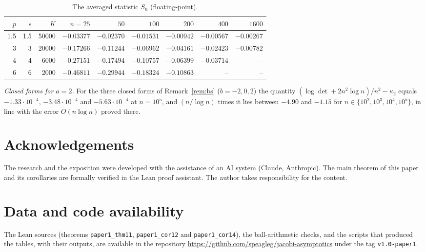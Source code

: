 \documentclass{amsart}
\theoremstyle{definition}
\theoremstyle{remark}
\numberwithin{equation}{section}
\begin{document}
\begin{table}[ht]
\centering
\small
\setlength{\tabcolsep}{3pt}
\begin{tabular}{rrrrrrrrr}
\hline
$p$ & $s$ & $K$ & $n=25$ & $50$ & $100$ & $200$ & $400$ & $1600$\\
\hline
1.5 & 1.5 & 50000 & $-0.03377$ & $-0.02370$ & $-0.01531$ & $-0.00942$ & $-0.00567$ & $-0.00267$\\
3   & 3   & 20000 & $-0.17266$ & $-0.11244$ & $-0.06962$ & $-0.04161$ & $-0.02423$ & $-0.00782$\\
4   & 4   & 6000  & $-0.27151$ & $-0.17494$ & $-0.10757$ & $-0.06399$ & $-0.03714$ & --\\
6   & 6   & 2000  & $-0.46811$ & $-0.29944$ & $-0.18324$ & $-0.10863$ & -- & --\\
\hline
\end{tabular}
\caption{The averaged statistic $S_n$ (floating-point).}
\label{tab:averaged}
\end{table}

\emph{Closed forms for $a=2$.} For the three closed forms of Remark~\ref{rem:bs} ($b=-2,0,2$) the quantity
$(\log\det+2n^2\log n)/n^2-\kappa_2$ equals $-1.33\cdot10^{-4}$, $-3.48\cdot10^{-4}$ and $-5.63\cdot10^{-4}$ at
$n=10^5$, and $(n/\log n)$ times it lies between $-4.90$ and $-1.15$ for $n\in\{10^2,10^3,10^4,10^5\}$, in line with
the error $O(n\log n)$ proved there.

\section*{Acknowledgements}
The research and the exposition were developed with the assistance of an AI system (Claude, Anthropic). The main
theorem of this paper and its corollaries are formally verified in the Lean proof assistant. The author takes
responsibility for the content.

\section*{Data and code availability}
{\raggedright The Lean sources (theorems \texttt{paper1\_thm11}, \texttt{paper1\_cor12} and \texttt{paper1\_cor14}), the
ball-arithmetic checks, and the scripts that produced the tables, with their outputs, are available in the repository
\url{https://github.com/speagleg/jacobi-asymptotics} under the tag \texttt{v1.0-paper1}.\par}



\end{document}
